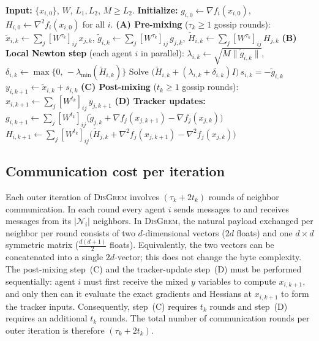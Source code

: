 \documentclass[review,onefignum,onetabnum]{siamart171218}
\begin{document}
	\begin{algorithm}[htbp]
\caption{\textsc{DisGrem}}
\label{alg:disgrem}
\small
\begin{algorithmic}[1]
\State \textbf{Input:} $\{x_{i,0}\}$, $W$, $L_1,L_2$, $M\ge L_2$.
\State \textbf{Initialize:} $g_{i,0}\gets\nabla f_i(x_{i,0})$, $H_{i,0}\gets\nabla^2 f_i(x_{i,0})$ for all $i$.
\State \textbf{(A) Pre-mixing} ($\tau_k\ge 1$ gossip rounds):
\Statex\qquad $\tilde x_{i,k}\gets\textstyle\sum_j [W^{\tau_k}]_{ij}\,x_{j,k}$,\quad
  $\tilde g_{i,k}\gets\textstyle\sum_j [W^{\tau_k}]_{ij}\,g_{j,k}$,\quad
  $\tilde H_{i,k}\gets\textstyle\sum_j [W^{\tau_k}]_{ij}\,H_{j,k}$
\State \textbf{(B) Local Newton step} (each agent $i$ in parallel):
\Statex\qquad $\lambda_{i,k}\gets\sqrt{M\|\tilde g_{i,k}\|}$,\quad
  $\delta_{i,k}\gets\max\{0,\,-\lambda_{\min}(\tilde H_{i,k})\}$
\Statex\qquad Solve $\bigl(\tilde H_{i,k}+(\lambda_{i,k}+\delta_{i,k})I\bigr)\,s_{i,k}=-\tilde g_{i,k}$
\Statex\qquad $y_{i,k+1}\gets\tilde x_{i,k}+s_{i,k}$
\State \textbf{(C) Post-mixing} ($t_k\ge 1$ gossip rounds):
\Statex\qquad $x_{i,k+1}\gets\textstyle\sum_j [W^{t_k}]_{ij}\,y_{j,k+1}$
\State \textbf{(D) Tracker updates:}
\Statex\qquad $g_{i,k+1}\gets\textstyle\sum_j [W^{t_k}]_{ij}\bigl(\tilde g_{j,k}+\nabla f_j(x_{j,k+1})-\nabla f_j(x_{j,k})\bigr)$
\Statex\qquad $H_{i,k+1}\gets\textstyle\sum_j [W^{t_k}]_{ij}\bigl(\tilde H_{j,k}+\nabla^2 f_j(x_{j,k+1})-\nabla^2 f_j(x_{j,k})\bigr)$
\EndFor
\end{algorithmic}
\end{algorithm}
	
\subsection{Communication cost per iteration}\label{ssec:comm}

Each outer iteration of \textsc{DisGrem} involves $(\tau_k + 2t_k)$ rounds of neighbor communication.
In each round every agent $i$ sends messages to and receives messages from its $|\mathcal N_i|$ neighbors.
In \textsc{DisGrem}, the natural payload exchanged per neighbor per round consists of
two $d$-dimensional vectors ($2d$ floats) and
one $d\times d$ symmetric matrix ($\tfrac{d(d+1)}{2}$ floats).
Equivalently, the two vectors can be concatenated into a single $2d$-vector; this does not change the byte complexity.
The post-mixing step~(C) and the tracker-update step~(D) must be performed sequentially: agent $i$ must first receive the mixed $y$ variables to compute $x_{i,k+1}$, and only then can it evaluate the exact gradients and Hessians at $x_{i,k+1}$ to form the tracker inputs. Consequently, step~(C) requires $t_k$ rounds and step~(D) requires an additional $t_k$ rounds. The total number of communication rounds per outer iteration is therefore $(\tau_k+2t_k)$.
\end{document}
